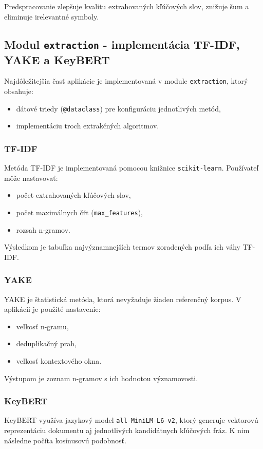 \documentclass[a4paper,12pt]{article}
\begin{document}
Predspracovanie zlepšuje kvalitu extrahovaných kľúčových slov, znižuje šum a eliminuje irelevantné symboly.

\subsection{Modul \texttt{extraction} - implementácia TF-IDF, YAKE a KeyBERT}

Najdôležitejšia časť aplikácie je implementovaná v module \texttt{extraction}, ktorý obsahuje:
\begin{itemize}
    \item dátové triedy (\texttt{@dataclass}) pre konfiguráciu jednotlivých metód,
    \item implementáciu troch extrakčných algoritmov.
\end{itemize}

\subsubsection*{TF-IDF}
Metóda TF-IDF je implementovaná pomocou knižnice \texttt{scikit-learn}. Používateľ môže nastavovať:
\begin{itemize}
    \item počet extrahovaných kľúčových slov,
    \item počet maximálnych čŕt (\texttt{max\_features}),
    \item rozsah n-gramov.
\end{itemize}

Výsledkom je tabuľka najvýznamnejších termov zoradených podľa ich váhy TF-IDF.

\subsubsection*{YAKE}
YAKE je štatistická metóda, ktorá nevyžaduje žiaden referenčný korpus. V aplikácii je použité nastavenie:
\begin{itemize}
    \item veľkosť n-gramu,
    \item deduplikačný prah,
    \item veľkosť kontextového okna.
\end{itemize}

Výstupom je zoznam n-gramov s ich hodnotou významovosti.

\subsubsection*{KeyBERT}
KeyBERT využíva jazykový model \texttt{all-MiniLM-L6-v2}, ktorý generuje vektorovú reprezentáciu dokumentu aj jednotlivých kandidátnych kľúčových fráz. K nim následne počíta kosínusovú podobnosť.
\end{document}
